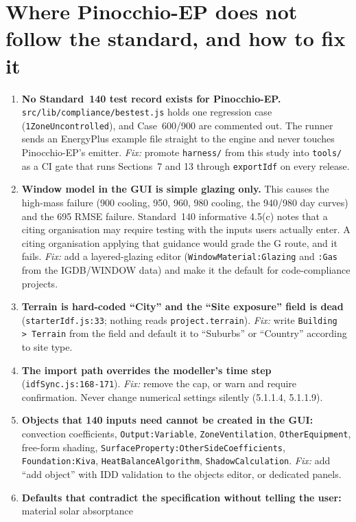 \documentclass[10pt,a4paper]{article}
\newcommand{\code}[1]{\texttt{\small #1}}
\begin{document}
\section{Where Pinocchio-EP does not follow the standard, and how to fix it}\label{sec:gaps}
\begin{enumerate}[label=\textbf{N\arabic*.},leftmargin=2.4em]
\item \textbf{No Standard~140 test record exists for Pinocchio-EP.} \code{src/lib/compliance/bestest.js} holds one
regression case (\code{1ZoneUncontrolled}), and Case~600/900 are commented out. The runner sends an EnergyPlus
example file straight to the engine and never touches Pinocchio-EP's emitter. \emph{Fix:} promote
\code{harness/} from this study into \code{tools/} as a CI gate that runs Sections~7 and 13 through
\code{exportIdf} on every release.
\item \textbf{Window model in the GUI is simple glazing only.} This causes the high-mass failure (900 cooling, 950,
960, 980 cooling, the 940/980 day curves) and the 695 RMSE failure. Standard~140 informative 4.5(c) notes that a
citing organisation may require testing with the inputs users actually enter. A citing organisation applying that
guidance would grade the G route, and it fails. \emph{Fix:} add a layered-glazing editor (\code{WindowMaterial:Glazing}
and \code{:Gas} from the IGDB/WINDOW data) and make it the default for code-compliance projects.
\item \textbf{Terrain is hard-coded ``City'' and the ``Site exposure'' field is dead} (\code{starterIdf.js:33};
nothing reads \code{project.terrain}). \emph{Fix:} write \code{Building\,\textgreater\,Terrain} from the field and
default it to ``Suburbs'' or ``Country'' according to site type.
\item \textbf{The import path overrides the modeller's time step} (\code{idfSync.js:168-171}). \emph{Fix:} remove the
cap, or warn and require confirmation. Never change numerical settings silently (5.1.1.4, 5.1.1.9).
\item \textbf{Objects that 140 inputs need cannot be created in the GUI:} convection coefficients,
\code{Output:Variable}, \code{ZoneVentilation}, \code{OtherEquipment}, free-form shading,
\code{SurfaceProperty:OtherSideCoefficients}, \code{Foundation:Kiva}, \code{HeatBalanceAlgorithm},
\code{ShadowCalculation}. \emph{Fix:} add ``add object'' with IDD validation to the objects editor, or dedicated
panels.
\item \textbf{Defaults that contradict the specification without telling the user:} material solar absorptance

\end{enumerate}
\end{document}
